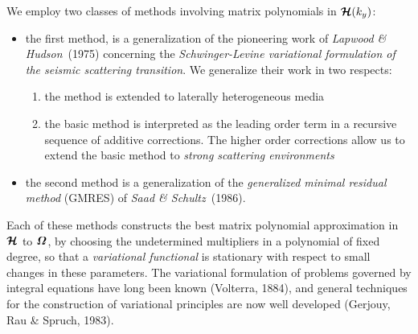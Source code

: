 We employ two classes of methods involving matrix polynomials in ${\mbox{\boldmath$\cal H$\unboldmath}}(k_y)$:
\begin{itemize}
\item the first method, is a
generalization of the pioneering work of {\em Lapwood \& 
Hudson\/}~(1975) concerning the {\em Schwinger-Levine variational 
formulation of the seismic scattering transition\/}. We generalize their 
work in two respects:
\begin{enumerate}
\item the method is extended to laterally heterogeneous media
\item the basic method is interpreted as the leading order term in a 
recursive sequence of additive corrections. The higher order corrections 
allow us to extend the basic method to {\em strong scattering 
environments\/} 
\end{enumerate}

\item the second method is a generalization of the {\em generalized 
minimal residual method\/} (GMRES) of {\em Saad \& Schultz\/}~(1986).

\end{itemize}

Each of these methods constructs the best matrix polynomial approximation 
in ${\mbox{\boldmath$\cal H$\unboldmath}}$ to ${\mbox{\boldmath$\mit \Omega$\unboldmath}}$,  by choosing the undetermined multipliers
in a  polynomial of fixed degree,  so that a {\em variational functional 
\/} is stationary
with respect to small changes in these parameters.
The variational formulation of problems governed by integral equations 
have long been known (Volterra, 1884), and general techniques for the 
construction of variational principles are now well developed (Gerjouy, 
Rau \& Spruch, 1983). 

